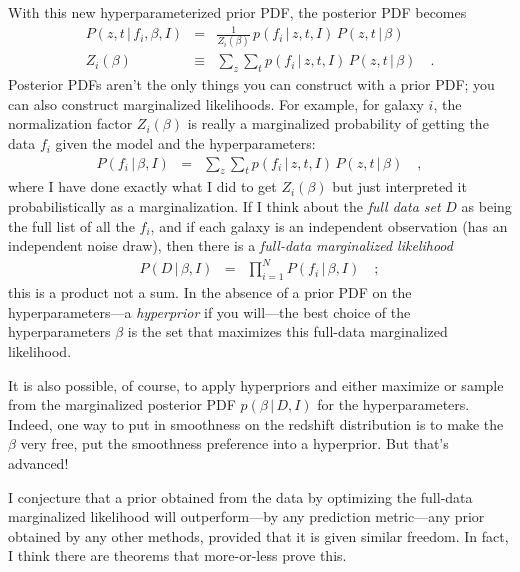 \documentclass[12pt]{article}
\newcommand{\given}{\,|\,}
\begin{document}
With this new hyper\-parameterized prior PDF, the posterior PDF becomes
\begin{eqnarray}\displaystyle
P(z, t \given f_i, \beta, I) &=&
  \frac{1}{Z_i(\beta)}\,p(f_i \given z, t, I)\,P(z, t \given \beta)
\\
Z_i(\beta) &\equiv& \sum_z\sum_t p(f_i \given z, t, I)\,P(z, t \given \beta)
\quad .
\end{eqnarray}
Posterior PDFs aren't the only things you can construct with a prior
PDF; you can also construct marginalized likelihoods.  For example,
for galaxy $i$, the normalization factor $Z_i(\beta)$ is really a
marginalized probability of getting the data $f_i$ given the model and
the hyper\-parameters:
\begin{eqnarray}\displaystyle
P(f_i \given \beta, I) &=&
  \sum_z\sum_t p(f_i \given z, t, I)\,P(z, t \given \beta)
\quad ,
\end{eqnarray}
where I have done exactly what I did to get $Z_i(\beta)$ but just
interpreted it probabilistically as a marginalization.  If I think
about the \emph{full data set} $D$ as being the full list of all the
$f_i$, and if each galaxy is an independent observation (has an
independent noise draw), then there is a \emph{full-data marginalized
  likelihood}
\begin{eqnarray}\displaystyle
P(D \given \beta, I) &=&
  \prod_{i=1}^N P(f_i \given \beta, I)
\quad ;
\end{eqnarray}
this is a product not a sum.  In the absence of a prior PDF on the
hyper\-parameters---a \emph{hyperprior} if you will---the best choice of
the hyper\-parameters $\beta$ is the set that maximizes this full-data
marginalized likelihood.

It is also possible, of course, to apply hyper\-priors and either
maximize or sample from the marginalized posterior PDF $p(\beta \given
D, I)$ for the hyper\-parameters.  Indeed, one way to put in
smoothness on the redshift distribution is to make the $\beta$ very
free, put the smoothness preference into a hyperprior.  But that's
advanced!

I conjecture that a prior obtained from the data by optimizing the
full-data marginalized likelihood will outperform---by any prediction
metric---any prior obtained by any other methods, provided that it is
given similar freedom.  In fact, I think there are theorems that
more-or-less prove this.
\end{document}
